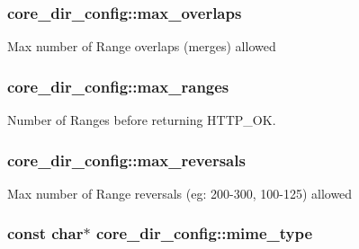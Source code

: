 \subsubsection[{\texorpdfstring{max\+\_\+overlaps}{max_overlaps}}]{ core\+\_\+dir\+\_\+config\+::max\+\_\+overlaps}\hypertarget{structcore__dir__config_a10485efc86e22fcdf83c8b5e697bb4cb}{}\label{structcore__dir__config_a10485efc86e22fcdf83c8b5e697bb4cb}
Max number of Range overlaps (merges) allowed 
\subsubsection[{\texorpdfstring{max\+\_\+ranges}{max_ranges}}]{ core\+\_\+dir\+\_\+config\+::max\+\_\+ranges}\hypertarget{structcore__dir__config_a3f48f0b0411dec35773f9125404aaad1}{}\label{structcore__dir__config_a3f48f0b0411dec35773f9125404aaad1}
Number of Ranges before returning H\+T\+T\+P\+\_\+\+OK. 
\subsubsection[{\texorpdfstring{max\+\_\+reversals}{max_reversals}}]{ core\+\_\+dir\+\_\+config\+::max\+\_\+reversals}\hypertarget{structcore__dir__config_a3eb005ca5a1025254338c72fcd2c55a0}{}\label{structcore__dir__config_a3eb005ca5a1025254338c72fcd2c55a0}
Max number of Range reversals (eg\+: 200-\/300, 100-\/125) allowed 
\subsubsection[{\texorpdfstring{mime\+\_\+type}{mime_type}}]{\setlength{\rightskip}{0pt plus 5cm}const char$\ast$ core\+\_\+dir\+\_\+config\+::mime\+\_\+type}\hypertarget{structcore__dir__config_a4ea857fc32bb84405a265e5ea22a01ec}{}\label{structcore__dir__config_a4ea857fc32bb84405a265e5ea22a01ec}
